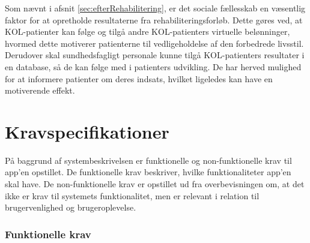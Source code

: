 Som nævnt i afsnit \ref{sec:efterRehabilitering}, er det sociale fællesskab en væsentlig faktor for at opretholde resultaterne fra rehabiliteringsforløb. Dette gøres ved, at KOL-patienter kan følge og tilgå andre KOL-patienters virtuelle belønninger, hvormed dette motiverer patienterne til vedligeholdelse af den forbedrede livsstil. Derudover skal sundhedsfagligt personale kunne tilgå KOL-patienters resultater i en database, så de kan følge med i patienters udvikling. De har herved mulighed for at informere patienter om deres indsats, hvilket ligeledes kan have en motiverende effekt.\citep{Gade2007, Tricomi2016}


\section{Kravspecifikationer} \label{sec:funktionellekrav}
På baggrund af systembeskrivelsen er funktionelle og non-funktionelle krav til app'en opstillet. De funktionelle krav beskriver, hvilke funktionaliteter app'en skal have. De non-funktionelle krav er opstillet ud fra overbevisningen om, at det ikke er krav til systemets funktionalitet, men er relevant i relation til brugervenlighed og brugeroplevelse. 


\subsubsection{Funktionelle krav}

